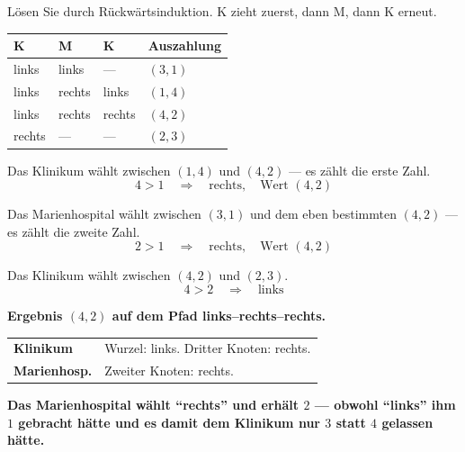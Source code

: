 \begin{aufgabe}
Lösen Sie durch Rückwärtsinduktion. K zieht zuerst, dann M, dann K erneut.
\begin{center}
{\small
\renewcommand{\arraystretch}{1.5}
\begin{tabular}{@{}P{1.8cm}P{1.8cm}P{1.8cm}P{2.4cm}@{}}
\toprule
\textbf{K} & \textbf{M} & \textbf{K} & \textbf{Auszahlung}\\
\midrule
links & links & --- & $(3,1)$\\
links & rechts & links & $(1,4)$\\
links & rechts & rechts & $(4,2)$\\
rechts & --- & --- & $(2,3)$\\
\bottomrule
\end{tabular}}
\end{center}

\loesung
{}
Das Klinikum wählt zwischen $(1,4)$ und $(4,2)$ --- es zählt die erste Zahl.
\[ 4 > 1 \quad\Longrightarrow\quad \text{rechts}, \quad \text{Wert } (4,2) \]

Das Marienhospital wählt zwischen $(3,1)$ und dem eben bestimmten $(4,2)$ --- es zählt die zweite Zahl.
\[ 2 > 1 \quad\Longrightarrow\quad \text{rechts}, \quad \text{Wert } (4,2) \]

Das Klinikum wählt zwischen $(4,2)$ und $(2,3)$.
\[ 4 > 2 \quad\Longrightarrow\quad \text{links} \]

\begin{center}
\begin{minipage}{0.9\textwidth}
\textbf{Ergebnis $(4,2)$ auf dem Pfad links--rechts--rechts.}
\end{minipage}
\end{center}

\begin{center}
{\small
\renewcommand{\arraystretch}{1.5}
\begin{tabular}{@{}P{2.0cm}P{6.4cm}@{}}
\toprule
\textbf{Klinikum} & Wurzel: links. Dritter Knoten: rechts.\\
\textbf{Marienhosp.} & Zweiter Knoten: rechts.\\
\bottomrule
\end{tabular}}
\end{center}

\begin{center}
\begin{minipage}{0.9\textwidth}
\textbf{Das Marienhospital wählt \enquote{rechts} und erhält $2$ --- obwohl \enquote{links} ihm $1$ gebracht hätte und es damit dem Klinikum nur $3$ statt $4$ gelassen hätte.}
\end{minipage}
\end{center}


\end{aufgabe}
